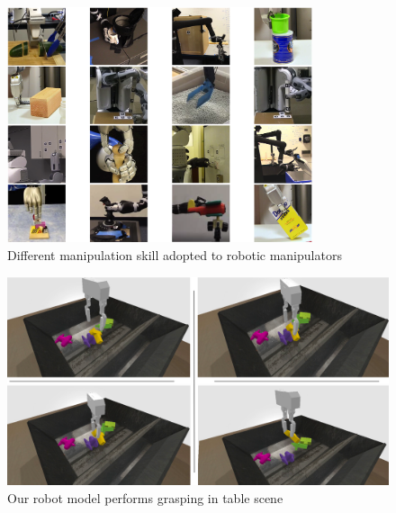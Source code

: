 \begin{figure}[htbp]
    \centering
      \includegraphics[width=0.8\textwidth]{figures/manipulation_skill}
    \caption{Different manipulation skill adopted to robotic manipulators \cite{Kroemer2019}}
    \label{fig:x manipulation_skills}
\end{figure}




\begin{figure}[htbp]
  \centering
    \includegraphics[width=1.\textwidth]{figures/newtable}
  \caption{ Our robot model performs grasping in table scene\label{fig:graspseq}}
\end{figure}

